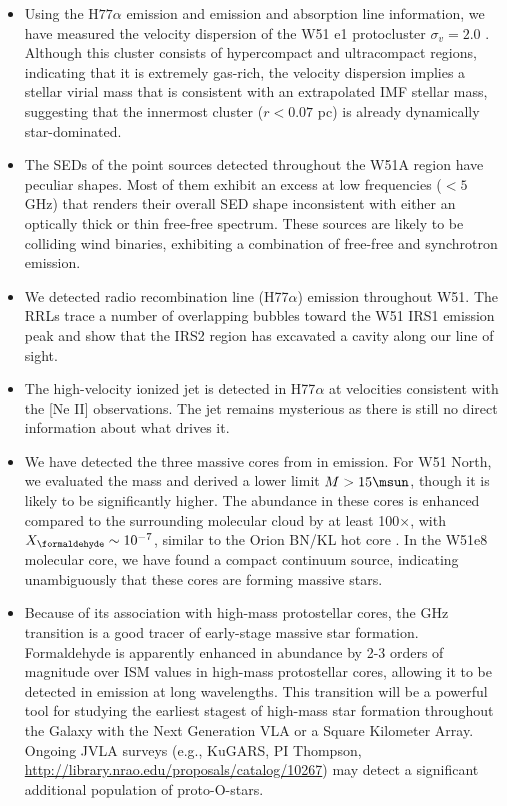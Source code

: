 \begin{itemize}
    \item Using the H$77\alpha$ emission and \formaldehyde emission and
        absorption line information, we have measured the velocity dispersion
        of the W51 e1 protocluster $\sigma_v=2.0$ \kms.  Although this cluster
        consists of hypercompact and ultracompact \hii regions, indicating that
        it is extremely gas-rich, the velocity dispersion implies a stellar
        virial mass that is consistent with an extrapolated IMF stellar mass,
        suggesting that the innermost cluster ($r<0.07$ pc) is already
        dynamically star-dominated.

\item The SEDs of the point sources detected throughout the W51A region have
peculiar shapes.  Most of them exhibit an excess at low frequencies ($<5$ GHz)
that renders their overall SED shape inconsistent with either an optically
thick or thin free-free spectrum.  These sources are likely to be colliding
wind binaries, exhibiting a combination of free-free and synchrotron emission.


\item We detected radio recombination line (H77$\alpha$) emission throughout
    W51.  The RRLs trace a number of overlapping bubbles toward the W51 IRS1
    emission peak and show that the IRS2 region has excavated a cavity along
    our line of sight.  

\item The \citet{Lacy2007a} high-velocity ionized jet is detected in
    H77$\alpha$ at velocities consistent with the [Ne II] observations.
    The jet remains mysterious as there is still no direct information about
    what drives it.  

\item We have detected the three massive cores from \citet{Zhang1997a} in
\formaldehyde \twotwo emission.  For W51 North, we evaluated the mass and
derived a lower limit $M>15 \msun$, though it is likely to be significantly
higher.  The \formaldehyde abundance in these cores is enhanced compared to the
surrounding molecular cloud by at least 100$\times$, with $X_{\formaldehyde}
\sim 10^{-7}$, similar to the Orion BN/KL hot core \citep{Mangum1993b}.  In the W51e8 molecular
core, we have found a compact continuum source, indicating unambiguously that
these cores are forming massive stars.

\item Because of its association with high-mass protostellar cores,
    the \formaldehyde {} GHz transition is a good tracer of
    early-stage massive star formation.  Formaldehyde is apparently enhanced in
    abundance by 2-3
orders of magnitude over ISM values in high-mass protostellar cores, allowing
it to be detected in emission at long wavelengths.  This transition will be a
powerful tool
for studying the earliest stagest of high-mass star formation throughout the
Galaxy with the Next Generation VLA or a Square Kilometer Array.  Ongoing JVLA surveys (e.g.,
KuGARS, PI Thompson, \url{http://library.nrao.edu/proposals/catalog/10267}) may
detect a significant additional population of proto-O-stars.


\end{itemize}

